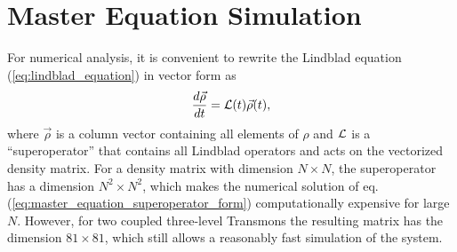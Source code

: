 \section{Master Equation Simulation}

For numerical analysis, it is convenient to rewrite the Lindblad equation (\ref{eq:lindblad_equation}) in vector form as
%
\begin{equation}
\frac{d\vec{\rho}}{dt} = {\cal L}(t)\vec{\rho}(t), \label{eq:master_equation_superoperator_form}
\end{equation}
%
where $\vec{\rho}$ is a column vector containing all elements of $\rho$ and $\cal L$ is a ``superoperator'' that contains all Lindblad operators and acts on the vectorized density matrix. For a density matrix with dimension $N\times N$, the superoperator has a dimension $N^2 \times N^2$, which makes the numerical solution of eq. (\ref{eq:master_equation_superoperator_form}) computationally expensive for large $N$. However, for two coupled three-level Transmons the resulting matrix has the dimension $81\times 81$, which still allows a reasonably fast simulation of the system.







%
